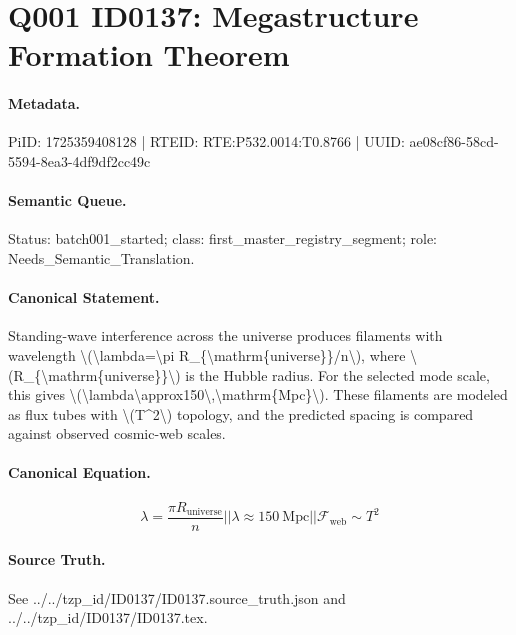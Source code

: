 \section*{Q001 ID0137: Megastructure Formation Theorem}
\paragraph{Metadata.}
PiID: 1725359408128 | RTEID: RTE:P532.0014:T0.8766 | UUID: ae08cf86-58cd-5594-8ea3-4df9df2cc49c

\paragraph{Semantic Queue.}
Status: batch001\_started; class: first\_master\_registry\_segment; role: Needs\_Semantic\_Translation.

\paragraph{Canonical Statement.}
Standing-wave interference across the universe produces filaments with wavelength \textbackslash{}(\textbackslash{}lambda=\textbackslash{}pi R\_\{\textbackslash{}mathrm\{universe\}\}/n\textbackslash{}), where \textbackslash{}(R\_\{\textbackslash{}mathrm\{universe\}\}\textbackslash{}) is the Hubble radius. For the selected mode scale, this gives \textbackslash{}(\textbackslash{}lambda\textbackslash{}approx150\textbackslash{},\textbackslash{}mathrm\{Mpc\}\textbackslash{}). These filaments are modeled as flux tubes with \textbackslash{}(T\textasciicircum{}2\textbackslash{}) topology, and the predicted spacing is compared against observed cosmic-web scales.

\paragraph{Canonical Equation.}
\[
\lambda=\frac{\pi R_{\mathrm{universe}}}{n} || \lambda \approx 150\ \mathrm{Mpc} || \mathcal{F}_{\mathrm{web}}\sim T^2
\]

\paragraph{Source Truth.}
See ../../tzp\_id/ID0137/ID0137.source\_truth.json and ../../tzp\_id/ID0137/ID0137.tex.
